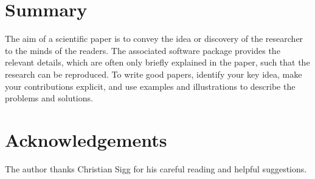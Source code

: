 \documentclass[10pt,conference,compsocconf]{IEEEtran}
\begin{document}
\section{Summary}

The aim of a scientific paper is to convey the idea or discovery of
the researcher to the minds of the readers. The associated software
package provides the relevant details, which are often only briefly
explained in the paper, such that the research can be reproduced.
To write good papers, identify your key idea, make your contributions
explicit, and use examples and illustrations to describe the problems
and solutions.

\section*{Acknowledgements}
The author thanks Christian Sigg for his careful reading and helpful
suggestions.



\end{document}
